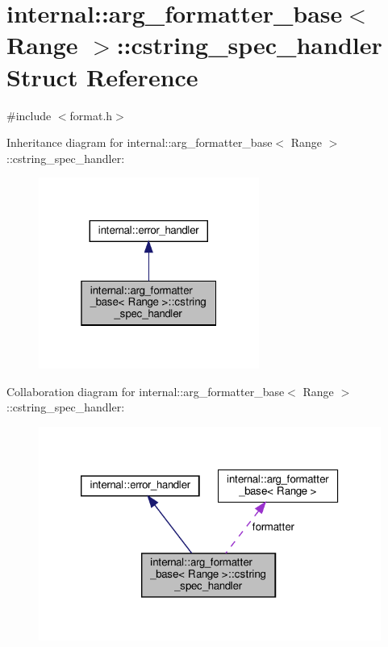 \hypertarget{structinternal_1_1arg__formatter__base_1_1cstring__spec__handler}{}\section{internal\+:\+:arg\+\_\+formatter\+\_\+base$<$ Range $>$\+:\+:cstring\+\_\+spec\+\_\+handler Struct Reference}
\label{structinternal_1_1arg__formatter__base_1_1cstring__spec__handler}


{\ttfamily \#include $<$format.\+h$>$}



Inheritance diagram for internal\+:\+:arg\+\_\+formatter\+\_\+base$<$ Range $>$\+:\+:cstring\+\_\+spec\+\_\+handler\+:
\nopagebreak
\begin{figure}[H]
\begin{center}
\leavevmode
\includegraphics[width=205pt]{structinternal_1_1arg__formatter__base_1_1cstring__spec__handler__inherit__graph}
\end{center}
\end{figure}


Collaboration diagram for internal\+:\+:arg\+\_\+formatter\+\_\+base$<$ Range $>$\+:\+:cstring\+\_\+spec\+\_\+handler\+:
\nopagebreak
\begin{figure}[H]
\begin{center}
\leavevmode
\includegraphics[width=320pt]{structinternal_1_1arg__formatter__base_1_1cstring__spec__handler__coll__graph}
\end{center}
\end{figure}
